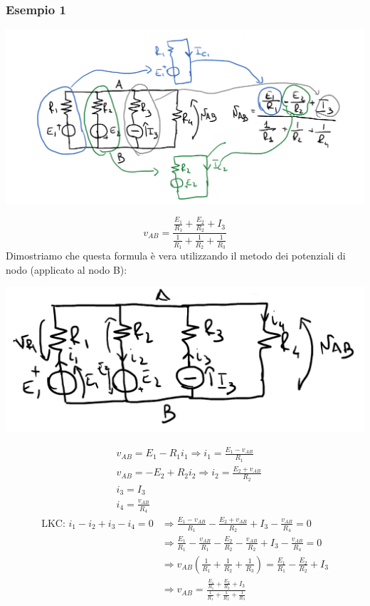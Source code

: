 \documentclass{article}
\begin{document}
\subsubsection{Esempio 1}
\begin{center}
    \includegraphics[scale=0.25]{Image/Es_Millman.png}
\end{center}
\[
    v_{AB} =\frac{\frac{E_1}{R_1}+\frac{E_2}{R_2} + I_3}{\frac{1}{R_1}+\frac{1}{R_2}+\frac{1}{R_3}}
\]
Dimostriamo che questa formula è vera utilizzando il metodo dei potenziali di nodo (applicato al nodo B):
\begin{center}
    \includegraphics[scale=0.3]{Image/Dim_Es_Millman.png}
\end{center}
\begin{align}
    &v_{AB} = E_1 - R_1i_1 \Rightarrow i_1 = \frac{E_1-v_{AB}}{R_1}\\
    &v_{AB} = -E_2+R_2i_2 \Rightarrow i_2 = \frac{E_2+v_{AB}}{R_2}    \\
    &i_3 = I_3    \\
    &i_4 = \frac{v_{AB}}{R_4}
\end{align}
\begin{align*}
    \text{LKC: } i_1-i_2+i_3-i_4=0 &\Rightarrow \frac{E_1-v_{AB}}{R_1} - \frac{E_2+v_{AB}}{R_2} + I_3 - \frac{v_{AB}}{R_4} = 0\\
    &\Rightarrow \frac{E_1}{R_1} - \frac{v_{AB}}{R_1} - \frac{E_2}{R_2} - \frac{v_{AB}}{R_2} + I_3 - \frac{v_{AB}}{R_4} = 0\\
    &\Rightarrow v_{AB} \left( \frac{1}{R_1} + \frac{1}{R_2} + \frac{1}{R_3} \right) = \frac{E_1}{R_1} - \frac{E_2}{R_2} + I_3\\
    &\Rightarrow v_{AB} = \frac{\frac{E_1}{R_1}+\frac{E_2}{R_2} + I_3}{\frac{1}{R_1}+\frac{1}{R_2}+\frac{1}{R_3}}
\end{align*}
\end{document}
